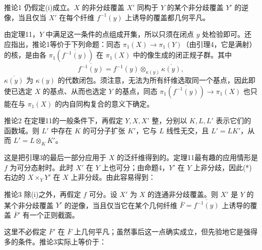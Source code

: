 \begin{statement}{推论1}
仍假定(i)成立。$X$ 的非分歧覆盖 $X'$ 同构于 $Y$ 的某个非分歧覆盖 $Y'$ 的逆像，当且仅当 $X'$ 在每个纤维 $f^{-1}(y)$ 上诱导的覆盖都几何平凡。
\end{statement}
由定理11，$Y$ 中满足这一条件的点组成开集，所以只须在闭点 $y$ 处检验即可。还应指出，推论1等价于下列命题：同态 $\pi_1(X)\to\pi_1(Y)$（由引理4，它是满射）的核，是由各 $\pi_1(\overline{f^{-1}(y)})$ 在 $\pi_1(X)$ 中的像生成的闭正规子群。其中
\[
\overline{f^{-1}(y)}=f^{-1}(y)\otimes_{\kappa(y)}\overline{\kappa(y)},
\]
$\overline{\kappa(y)}$ 为 $\kappa(y)$ 的代数闭包。须注意，无法为所有纤维选取同一个基点，因此即使已选定 $X$ 的基点、从而也选定 $Y$ 的基点，同态 $\pi_1(\overline{f^{-1}(y)})\to\pi_1(X)$ 也只能在与 $\pi_1(X)$ 的内自同构复合的意义下确定。

\begin{statement}{推论2}
在定理11的一般条件下，再假定 $Y,X,X'$ 整，分别以 $K,L,L'$ 表示它们的函数域。则 $L'$ 中存在 $K$ 的可分子扩张 $K'$，它与 $L$ 线性无交，且 $L'=LK'$，从而 $L'=L\otimes_KK'$。
\end{statement}
这是把引理3的最后一部分应用于 $X$ 的泛纤维得到的。定理11最有趣的应用情形是 $f$ 为可分态射时。此时 $X'$ 在 $Y$ 上也可分；由命题4，$Y'$ 在 $Y$ 上非分歧，因此(*)右边的 $X\times_YY'$ 在 $X$ 上非分歧。由此容易得到：
\begin{statement}{推论3}
除(i)之外，再假定 $f$ 可分。设 $X'$ 为 $X$ 的连通非分歧覆盖。则 $X'$ 是 $Y$ 的某个非分歧覆盖 $Y'$ 的逆像，当且仅当它在某个几何纤维 $\overline F=\overline{f^{-1}(y)}$ 上诱导的覆盖 $\overline F'$ 有一个正则截面。
\end{statement}
这里不必假定 $\overline F'$ 在 $\overline F$ 上几何平凡；虽然事后这一点确实成立，但先验地它是强得多的条件。推论3实际上等价于：

